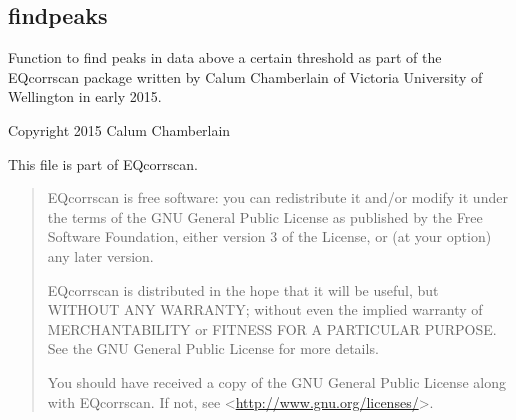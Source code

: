 \documentclass[a4paper,10pt,english]{sphinxmanual}
\begin{document}
\subsection{findpeaks}
\label{submodules/utils.findpeaks:module-findpeaks}\label{submodules/utils.findpeaks::doc}\label{submodules/utils.findpeaks:findpeaks}
Function to find peaks in data above a certain threshold as part of the EQcorrscan package written by Calum Chamberlain of Victoria University of Wellington in early 2015.

Copyright 2015 Calum Chamberlain

This file is part of EQcorrscan.
\begin{quote}

EQcorrscan is free software: you can redistribute it and/or modify
it under the terms of the GNU General Public License as published by
the Free Software Foundation, either version 3 of the License, or
(at your option) any later version.

EQcorrscan is distributed in the hope that it will be useful,
but WITHOUT ANY WARRANTY; without even the implied warranty of
MERCHANTABILITY or FITNESS FOR A PARTICULAR PURPOSE.  See the
GNU General Public License for more details.

You should have received a copy of the GNU General Public License
along with EQcorrscan.  If not, see \textless{}\href{http://www.gnu.org/licenses/}{http://www.gnu.org/licenses/}\textgreater{}.
\end{quote}
\end{document}
